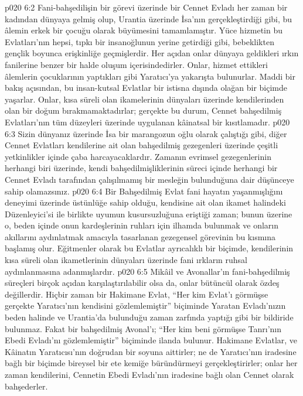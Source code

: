 \vs p020 6:2 Fani\hyp{}bahşedilişin bir görevi üzerinde bir Cennet Evladı her zaman bir kadından dünyaya gelmiş olup, Urantia üzerinde İsa’nın gerçekleştirdiği gibi, bu âlemin erkek bir çocuğu olarak büyümesini tamamlamıştır. Yüce hizmetin bu Evlatları’nın hepsi, tıpkı bir insanoğlunun yerine getirdiği gibi, bebeklikten gençlik boyunca erişkinliğe geçmişlerdir. Her açıdan onlar dünyaya geldikleri ırkın fanilerine benzer bir halde oluşum içerisindedirler. Onlar, hizmet ettikleri âlemlerin çocuklarının yaptıkları gibi Yaratıcı’ya yakarışta bulunurlar. Maddi bir bakış açısından, bu insan\hyp{}kutsal Evlatlar bir istisna dışında olağan bir biçimde yaşarlar. Onlar, kısa süreli olan ikamelerinin dünyaları üzerinde kendilerinden olan bir doğum bırakmamaktadırlar; gerçekte bu durum, Cennet bahşedilmiş Evlatları’nın tüm düzeyleri üzerinde uygulanan kâinatsal bir kısıtlamadır.
\vs p020 6:3 Sizin dünyanız üzerinde İsa bir marangozun oğlu olarak çalıştığı gibi, diğer Cennet Evlatları kendilerine ait olan bahşedilmiş gezegenleri üzerinde çeşitli yetkinlikler içinde çaba harcayacaklardır. Zamanın evrimsel gezegenlerinin herhangi biri üzerinde, kendi bahşedilmişliklerinin süreci içinde herhangi bir Cennet Evladı tarafından çalışılmamış bir mesleğin bulunduğuna dair düşünceye sahip olamazsınız.
\vs p020 6:4 Bir Bahşedilmiş Evlat fani hayatın yaşanmışlığını deneyimi üzerinde üstünlüğe sahip olduğu, kendisine ait olan ikamet halindeki Düzenleyici’si ile birlikte uyumun kusursuzluğuna eriştiği zaman; bunun üzerine o, beden içinde onun kardeşlerinin ruhları için ilhamda bulunmak ve onların akıllarını aydınlatmak amacıyla tasarlanan gezegensel görevinin bu kısmına başlamış olur. Eğitmenler olarak bu Evlatlar ayrıcalıklı bir biçimde, kendilerinin kısa süreli olan ikametlerinin dünyaları üzerinde fani ırkların ruhsal aydınlanmasına adanmışlardır.
\vs p020 6:5 Mikâil ve Avonallar’ın fani\hyp{}bahşedilmiş süreçleri birçok açıdan karşılaştırılabilir olsa da, onlar bütüncül olarak özdeş değillerdir. Hiçbir zaman bir Hakimane Evlat, “Her kim Evlat’ı görmüşse gerçekte Yaratıcı’nın kendisini gözlemlemiştir” biçiminde Yaratan Evladı’nızın beden halinde ve Urantia’da bulunduğu zaman zarfında yaptığı gibi bir bildiride bulunmaz. Fakat bir bahşedilmiş Avonal’ı; “Her kim beni görmüşse Tanrı’nın Ebedi Evladı’nı gözlemlemiştir” biçiminde ilanda bulunur. Hakimane Evlatlar, ve Kâinatın Yaratıcısı’nın doğrudan bir soyuna aittirler; ne de Yaratıcı’nın iradesine bağlı bir biçimde bireysel bir ete kemiğe büründürmeyi gerçekleştirirler; onlar her zaman kendilerini, Cennetin Ebedi Evladı’nın iradesine bağlı olan Cennet  olarak bahşederler.
